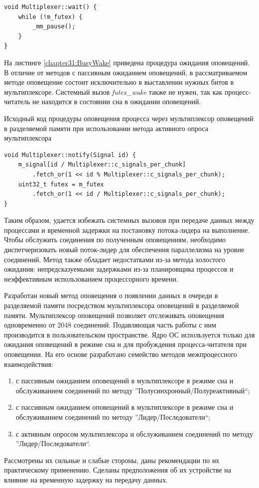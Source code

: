 \begin{lstlisting}[float=!h,caption={Исходный код процедуры ожидания оповещений через мультиплексор оповещений в разделяемой памяти при использовании метода активного опроса мультиплексора},label={chapter31:BusyWait},frame=tlrb]
void Multiplexer::wait() {
	while (!m_futex) {
		_mm_pause();
	}
}
\end{lstlisting}

На листинге \ref{chapter31:BusyWake} приведена процедура ожидания оповещений. В отличие от методов с пассивным ожиданием оповещений, в рассматриваемом методе оповещение состоит исключительно в выставлении нужных битов в мультиплексоре. Системный вызов \textit{futex\_wake} также не нужен, так как процесс-читатель не находится в состоянии сна в ожидании оповещений.

\begin{algorithm}[!h]
\caption{Исходный код процедуры оповещения процесса через мультиплексор оповещений в разделяемой памяти при использовании метода активного опроса мультиплексора}
\label{chapter31:BusyWake}
\begin{lstlisting}[frame=tlrb]
void Multiplexer::notify(Signal id) {
	m_signal[id / Multiplexer::c_signals_per_chunk]
		.fetch_or(1 << id % Multiplexer::c_signals_per_chunk);
	uint32_t futex = m_futex
		.fetch_or(1 << id / Multiplexer::c_signals_per_chunk);
}
\end{lstlisting}
\end{algorithm}

Таким образом, удается избежать системных вызовов при передаче данных между процессами и временной задержки на постановку потока-лидера на выполнение. Чтобы обслужить соединения по полученным оповещениям, необходимо диспетчеризовать новый поток-лидер для обеспечения параллелизма на уровне соединений.
Метод также обладает недостатками из-за метода холостого ожидания: непредсказуемыми задержками из-за планировщика процессов и неэффективным использованием процессорного времени.

\chapterconclusion

Разработан новый метод оповещения о появлении данных в очереди в разделяемой памяти посредством мультиплексора оповещений в разделяемой памяти. Мультиплексор оповещений позволяет отслеживать оповещения одновременно от 2048 соединений. Подавляющая часть работы с ним производится в пользовательском пространстве. Ядро ОС используется только для ожидания оповещений в режиме сна и для пробуждения процесса-читателя при оповещении. 
На его основе разработано семейство методов межпроцессного взаимодействия:
\begin{enumerate}
\item с пассивным ожиданием оповещений в мультиплексоре в режиме сна и обслуживанием соединений по методу ''Полусинхронный/Полуреактивный``;
\item с пассивным ожиданием оповещений в мультиплексоре в режиме сна и обслуживанием соединений по методу ''Лидер/Последователи``;
\item с активным опросом мультиплексора и обслуживанием соединений по методу ''Лидер/Последователи``.
\end{enumerate}

Рассмотрены их сильные и слабые стороны, даны рекомендации по их практическому применению. Сделаны предположения об их устройстве на влияние на временную задержку на передачу данных.
